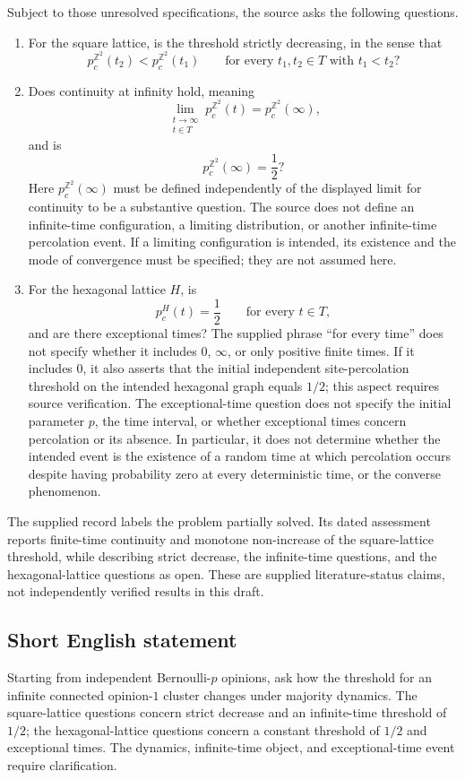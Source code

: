 \documentclass[11pt]{article}
\newcommand{\Z}{\mathbb{Z}}
\begin{document}
Subject to those unresolved specifications, the source asks the following questions.
\begin{enumerate}
\item For the square lattice, is the threshold strictly decreasing, in the sense that
\[
 p_c^{\Z^2}(t_2)<p_c^{\Z^2}(t_1)
 \qquad\text{for every }t_1,t_2\in T\text{ with }t_1<t_2?
\]
\item Does continuity at infinity hold, meaning
\[
 \lim_{\substack{t\to\infty\\t\in T}}p_c^{\Z^2}(t)
 =p_c^{\Z^2}(\infty),
\]
and is
\[
 p_c^{\Z^2}(\infty)=\frac12?
\]
Here \(p_c^{\Z^2}(\infty)\) must be defined independently of the displayed limit for continuity to be a substantive question. The source does not define an infinite-time configuration, a limiting distribution, or another infinite-time percolation event. If a limiting configuration is intended, its existence and the mode of convergence must be specified; they are not assumed here.
\item For the hexagonal lattice \(H\), is
\[
 p_c^H(t)=\frac12\qquad\text{for every }t\in T,
\]
and are there exceptional times? The supplied phrase ``for every time'' does not specify whether it includes \(0\), \(\infty\), or only positive finite times. If it includes \(0\), it also asserts that the initial independent site-percolation threshold on the intended hexagonal graph equals \(1/2\); this aspect requires source verification. The exceptional-time question does not specify the initial parameter \(p\), the time interval, or whether exceptional times concern percolation or its absence. In particular, it does not determine whether the intended event is the existence of a random time at which percolation occurs despite having probability zero at every deterministic time, or the converse phenomenon.
\end{enumerate}

The supplied record labels the problem partially solved. Its dated assessment reports finite-time continuity and monotone non-increase of the square-lattice threshold, while describing strict decrease, the infinite-time questions, and the hexagonal-lattice questions as open. These are supplied literature-status claims, not independently verified results in this draft.
\subsection{Short English statement}
Starting from independent Bernoulli-\(p\) opinions, ask how the threshold for an infinite connected opinion-\(1\) cluster changes under majority dynamics. The square-lattice questions concern strict decrease and an infinite-time threshold of \(1/2\); the hexagonal-lattice questions concern a constant threshold of \(1/2\) and exceptional times. The dynamics, infinite-time object, and exceptional-time event require clarification.
\end{document}

